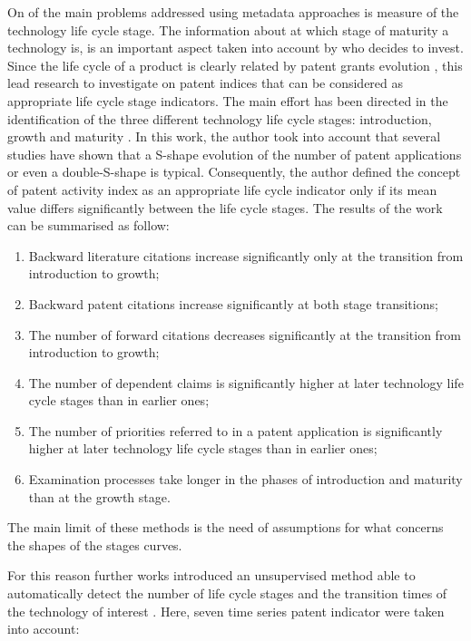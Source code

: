 \documentclass[]{book}
\providecommand{\tightlist}{%
  \setlength{\itemsep}{0pt}\setlength{\parskip}{0pt}}
\theoremstyle{definition}
\theoremstyle{definition}
\theoremstyle{definition}
\theoremstyle{remark}
\begin{document}
On of the main problems addressed using metadata approaches is measure
of the technology life cycle stage. The information about at which stage
of maturity a technology is, is an important aspect taken into account
by who decides to invest. Since the life cycle of a product is clearly
related by patent grants evolution \citep{andersen1999hunt}, this lead
research to investigate on patent indices that can be considered as
appropriate life cycle stage indicators. The main effort has been
directed in the identification of the three different technology life
cycle stages: introduction, growth and maturity \citep{haupt2007patent}.
In this work, the author took into account that several studies have
shown that a S-shape evolution of the number of patent applications or
even a double-S-shape is typical. Consequently, the author defined the
concept of patent activity index as an appropriate life cycle indicator
only if its mean value differs significantly between the life cycle
stages. The results of the work can be summarised as follow:

\begin{enumerate}
\def\labelenumi{\arabic{enumi}.}
\tightlist
\item
  Backward literature citations increase significantly only at the
  transition from introduction to growth;
\item
  Backward patent citations increase significantly at both stage
  transitions;
\item
  The number of forward citations decreases significantly at the
  transition from introduction to growth;
\item
  The number of dependent claims is significantly higher at later
  technology life cycle stages than in earlier ones;
\item
  The number of priorities referred to in a patent application is
  significantly higher at later technology life cycle stages than in
  earlier ones;
\item
  Examination processes take longer in the phases of introduction and
  maturity than at the growth stage.
\end{enumerate}

The main limit of these methods is the need of assumptions for what
concerns the shapes of the stages curves.

For this reason further works introduced an unsupervised method able to
automatically detect the number of life cycle stages and the transition
times of the technology of interest \citep{lee2016stochastic}. Here,
seven time series patent indicator were taken into account:
\end{document}
